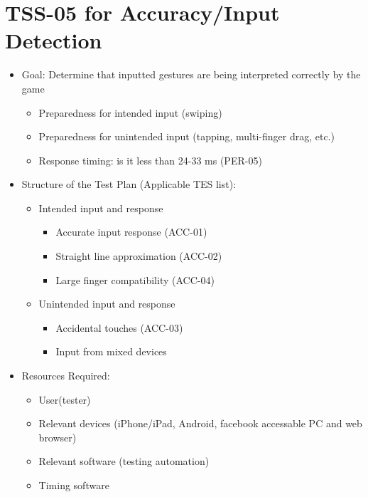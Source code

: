 \section{TSS-05 for Accuracy/Input Detection}
\begin{itemize}
\item Goal: Determine that inputted gestures are being interpreted correctly by the game
\begin{itemize}
\item Preparedness for intended input (swiping)
\item Preparedness for unintended input (tapping, multi-finger drag, etc.)
\item Response timing: is it less than 24-33 ms (PER-05)
\end{itemize}

\item Structure of the Test Plan (Applicable TES list):
\begin{itemize}
\item Intended input and response
\begin{itemize}
\item Accurate input response (ACC-01)
\item Straight line approximation (ACC-02)
\item Large finger compatibility (ACC-04)
\end{itemize}

\item Unintended input and response
\begin{itemize}
\item Accidental touches (ACC-03)
\item Input from mixed devices
\end{itemize}
\end{itemize}

\item Resources Required:
\begin{itemize}
\item User(tester)
\item Relevant devices (iPhone/iPad, Android, facebook accessable PC and web browser)
\item Relevant software (testing automation)
\item Timing software
\end{itemize}
\end{itemize}


